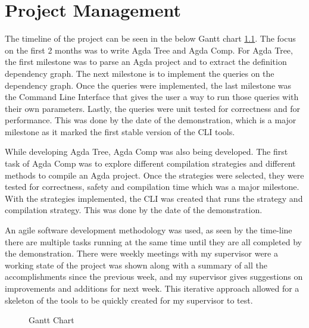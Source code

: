 
\chapter{Project Management}

The timeline of the project can be seen in the below Gantt chart
\cref{fig:Gantt}. The focus on the first 2 months was to write Agda Tree and
Agda Comp. For Agda Tree, the first milestone was to parse an Agda project and to
extract the definition dependency graph. The next milestone is to implement the
queries on the dependency graph. Once the queries were implemented,
the last milestone was the Command Line Interface that gives the user a
way to run those queries with their own parameters. Lastly, the queries were
unit tested for correctness and for performance. This was done by the
date of the demonstration, which is a major milestone as it marked the first
stable version of the CLI tools.

While developing Agda Tree, Agda Comp was also being developed. The first task
of Agda Comp was to explore different compilation strategies and different
methods to compile an Agda project. Once the strategies were selected, they
were tested for correctness, safety and compilation time which was a major
milestone. With the strategies implemented, the CLI was created that
runs the strategy and compilation strategy. This was done by the date
of the demonstration.

An agile software development methodology was used, as seen by the time-line
there are multiple tasks running at the same time until they are all completed
by the demonstration. There were weekly meetings with my supervisor were a
working state of the project was shown along with a summary of all the
accomplishments since the previous week, and my supervisor gives suggestions on
improvements and additions for next week. This iterative approach allowed for
a skeleton of the tools to be quickly created for my supervisor to test.

\begin{figure}[H]
    \centering
    \label{fig:Gantt}
    \caption{Gantt Chart}
\end{figure} 


